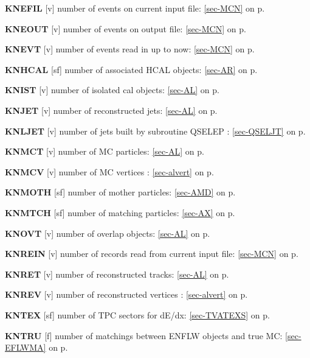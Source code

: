  \item{\bf KNEFIL  }[v] number of events on current input file:
 \ref{sec-MCN} on p.~\pageref{sec-MCN}\\
 \item{\bf KNEOUT  }[v] number of events on output file: \ref{sec-MCN} on p.~\pageref{sec-MCN}\\
 \item{\bf KNEVT   }[v] number of events read in up to now:
 \ref{sec-MCN} on p.~\pageref{sec-MCN}\\
 \item{\bf KNHCAL  }[sf] number of associated HCAL objects: \ref{sec-AR} on p.~\pageref{sec-AR}\\
 \item{\bf KNIST   }[v] number of isolated cal objects: \ref{sec-AL} on p.~\pageref{sec-AL}\\
 \item{\bf KNJET   }[v] number of reconstructed jets: \ref{sec-AL} on p.~\pageref{sec-AL}\\
 \item{\bf KNLJET  }[v] number of jets built by subroutine QSELEP : \ref{sec-QSELJT} on p.~\pageref{sec-QSELJT}\\
 \item{\bf KNMCT   }[v] number of MC particles: \ref{sec-AL} on p.~\pageref{sec-AL}\\
 \item{\bf KNMCV   }[v] number of MC vertices : \ref{sec-alvert} on p.~\pageref{sec-alvert}\\
 \item{\bf KNMOTH  }[sf] number of mother particles: \ref{sec-AMD} on p.~\pageref{sec-AMD}\\
 \item{\bf KNMTCH  }[sf] number of matching particles: \ref{sec-AX} on p.~\pageref{sec-AX}\\
 \item{\bf KNOVT   }[v] number of overlap objects: \ref{sec-AL} on p.~\pageref{sec-AL}\\
 \item{\bf KNREIN  }[v] number of records read from current input
 file:
 \ref{sec-MCN} on p.~\pageref{sec-MCN}\\
 \item{\bf KNRET   }[v] number of reconstructed tracks: \ref{sec-AL} on p.~\pageref{sec-AL}\\
 \item{\bf KNREV   }[v] number of reconstructed vertices  : \ref{sec-alvert} on p.~\pageref{sec-alvert}\\
 \item{\bf KNTEX   }[sf] number of TPC sectors for dE/dx:
 \ref{sec-TVATEXS} on p.~\pageref{sec-TVATEXS}\\
 \item{\bf KNTRU   }[f] number of matchings between ENFLW objects and true MC:
  \ref{sec-EFLWMA} on p.~\pageref{sec-EFLWMA}
 
